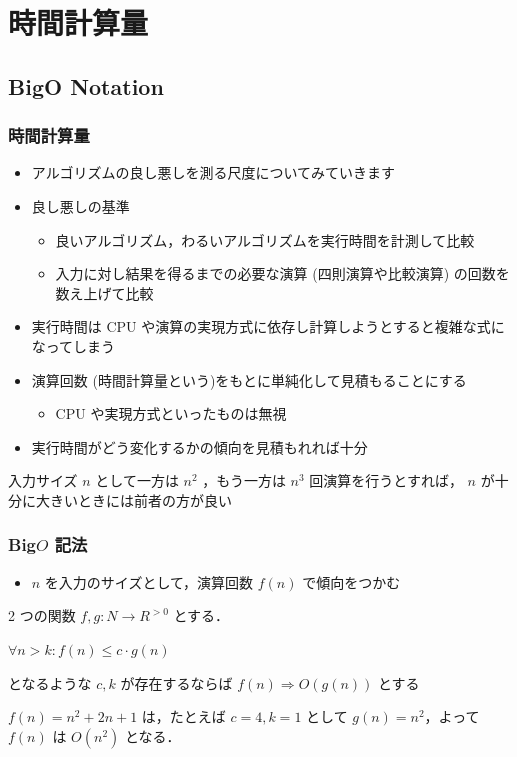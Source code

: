 \section{時間計算量}
\subsection{Big\textendash O Notation}
\begin{frame}[shrink]
\frametitle{時間計算量}
  \begin{itemize}
\item アルゴリズムの良し悪しを測る尺度についてみていきます
\item 良し悪しの基準
    \begin{itemize}
\item 良いアルゴリズム，わるいアルゴリズムを実行時間を計測して比較
\item 入力に対し結果を得るまでの必要な演算 (四則演算や比較演算) の回数を数え上げて比較
    \end{itemize}
\item 実行時間は CPU や演算の実現方式に依存し計算しようとすると複雑な式になってしまう
\item 演算回数 (時間計算量という)をもとに単純化して見積もることにする
    \begin{itemize}
\item CPU や実現方式といったものは無視
    \end{itemize}
\item 実行時間がどう変化するかの傾向を見積もれれば十分
  \end{itemize}
  \begin{example}
入力サイズ $n$ として一方は \(n^2\) ，もう一方は \(n^3\) 回演算を行うとすれば，
 $n$ が十分に大きいときには前者の方が良い
  \end{example}
\end{frame}
\begin{frame}[shrink]
\frametitle{Big\textendash$O$ 記法}
  \begin{itemize}
\item $n$ を入力のサイズとして，演算回数 \(f(n)\) で傾向をつかむ
  \end{itemize}
  \begin{definition}
2 つの関数 \(f, g\colon N\rightarrow R^{>0}\) とする．
    \begin{center}
\(\forall n>k\colon f(n)\leq c\cdot g(n)\)
    \end{center}
となるような \(c, k\) が存在するならば \(f(n)\Rightarrow O(g(n))\) とする
  \end{definition}
  \begin{example}
\(f(n)=n^2+2n+1\) は，たとえば \(c=4, k=1\) として \(g(n)=n^2\)，よって \(f(n)\) は \(O(n^2)\) となる．
  \end{example}
\end{frame}
